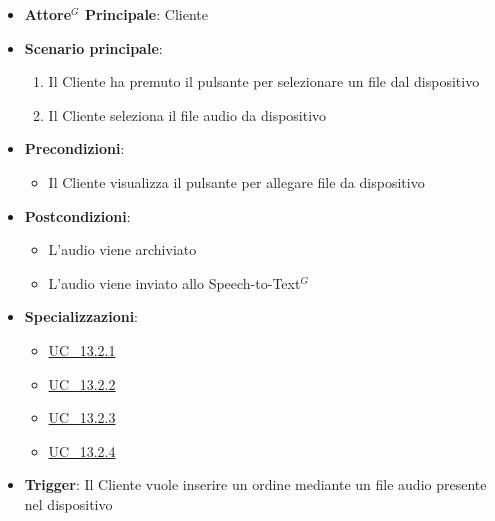 \begin{itemize}
    \item \textbf{Attore$^G$ Principale}: Cliente
    \item \textbf{Scenario principale}:
        \begin{enumerate}
            \item Il Cliente ha premuto il pulsante per selezionare un file dal dispositivo
            \item Il Cliente seleziona il file audio da dispositivo
        \end{enumerate}
    \item \textbf{Precondizioni}:
        \begin{itemize}
            \item Il Cliente visualizza il pulsante per allegare file da dispositivo
        \end{itemize}
    \item \textbf{Postcondizioni}: 
        \begin{itemize}
            \item L'audio viene archiviato
            \item L'audio viene inviato allo Speech-to-Text$^G$ 
        \end{itemize}
    \item \textbf{Specializzazioni}:
        \begin{itemize}
            \item \hyperref[uc_13.2.1]{UC\_13.2.1}
            \item \hyperref[uc_13.2.2]{UC\_13.2.2}
            \item \hyperref[uc_13.2.3]{UC\_13.2.3}
            \item \hyperref[uc_13.2.4]{UC\_13.2.4}
        \end{itemize}
    \item \textbf{Trigger}: Il Cliente vuole inserire un ordine mediante un file audio presente nel dispositivo
\end{itemize}

\label{uc_13.2.1}

